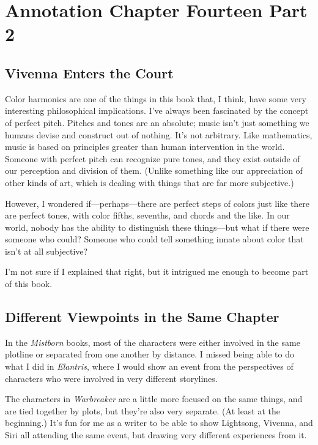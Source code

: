 \section{Annotation Chapter Fourteen Part 2}

\subsection*{Vivenna Enters the Court}

Color harmonics are one of the things in this book that, I think, have some very interesting philosophical implications. I’ve always been fascinated by the concept of perfect pitch. Pitches and tones are an absolute; music isn’t just something we humans devise and construct out of nothing. It’s not arbitrary. Like mathematics, music is based on principles greater than human intervention in the world. Someone with perfect pitch can recognize pure tones, and they exist outside of our perception and division of them. (Unlike something like our appreciation of other kinds of art, which is dealing with things that are far more subjective.)

However, I wondered if—perhaps—there are perfect steps of colors just like there are perfect tones, with color fifths, sevenths, and chords and the like. In our world, nobody has the ability to distinguish these things—but what if there were someone who could? Someone who could tell something innate about color that isn’t at all subjective?

I’m not sure if I explained that right, but it intrigued me enough to become part of this book.

\subsection*{Different Viewpoints in the Same Chapter}

In the \textit{Mistborn} books, most of the characters were either involved in the same plotline or separated from one another by distance. I missed being able to do what I did in \textit{Elantris}, where I would show an event from the perspectives of characters who were involved in very different storylines.

The characters in \textit{Warbreaker} are a little more focused on the same things, and are tied together by plots, but they’re also very separate. (At least at the beginning.) It’s fun for me as a writer to be able to show Lightsong, Vivenna, and Siri all attending the same event, but drawing very different experiences from it.




